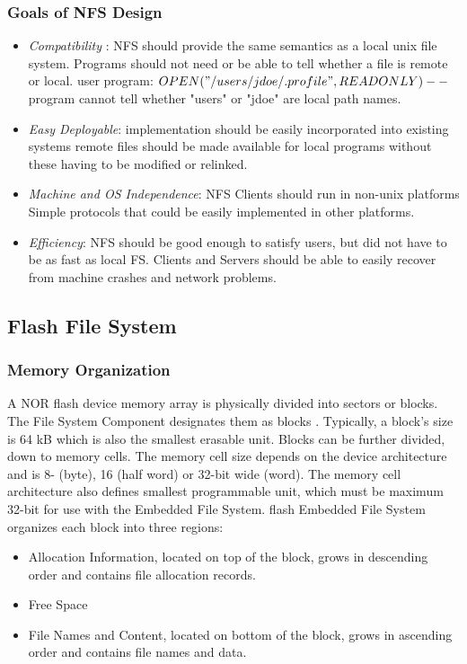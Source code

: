 \documentclass[12pt]{article}
\begin{document}
\subsubsection{Goals of NFS Design}

\begin{itemize}
	\item \emph{Compatibility} : NFS should provide the same semantics as a local unix file system. Programs should not need or be able to tell whether a file is remote or local. user program: $OPEN("/users/jdoe/.profile", READONLY) -- $program cannot tell whether "users" or "jdoe" are local path names.
	\item \emph{Easy Deployable}: implementation should be easily incorporated into existing systems remote files should be made available for local programs without these having to be modified or relinked.
	\item \emph{Machine and OS Independence}: NFS Clients should run in non-unix platforms Simple protocols that could be easily implemented in other platforms.
		
	\item \emph{Efficiency}: NFS should be good enough to satisfy users, but did not have to be as fast as local FS. Clients and Servers should be able to easily recover from machine crashes and network problems.
	
\end{itemize}	

\subsection{Flash File System}

\subsubsection{Memory Organization}

A NOR flash device memory array is physically divided into sectors or blocks. The File System Component designates them as blocks . Typically, a block's size is 64 kB which is also the smallest erasable unit. Blocks can be further divided, down to memory cells. The memory cell size depends on the device architecture and is 8- (byte), 16 (half word) or 32-bit wide (word). The memory cell architecture also defines smallest programmable unit, which must be maximum 32-bit for use with the Embedded File System.
flash
Embedded File System organizes each block into three regions:

\begin{itemize}
	\item Allocation Information, located on top of the block, grows in descending order and contains file allocation records.
	\item Free Space	
	\item File Names and Content, located on bottom of the block, grows in ascending order and contains file names and data.

\end{itemize}
\end{document}
